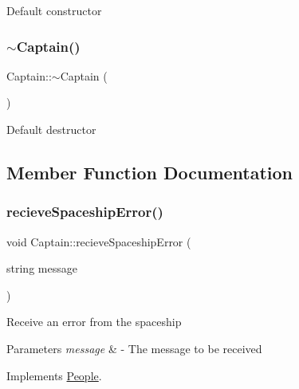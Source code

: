 Default constructor \mbox{\label{classCaptain_a6b8671d624f45a11b7fd33f5ff9a6930}} 
\subsubsection{\texorpdfstring{$\sim$\+Captain()}{~Captain()}}
{\footnotesize\ttfamily Captain\+::$\sim$\+Captain (\begin{DoxyParamCaption}{ }\end{DoxyParamCaption})\hspace{0.3cm}{\ttfamily [inline]}}

Default destructor 

\subsection{Member Function Documentation}
\mbox{\label{classCaptain_a39ebd40ec094b410f295188bb6262009}} 
\subsubsection{\texorpdfstring{recieve\+Spaceship\+Error()}{recieveSpaceshipError()}}
{\footnotesize\ttfamily void Captain\+::recieve\+Spaceship\+Error (\begin{DoxyParamCaption}\item[{string}]{message }\end{DoxyParamCaption})\hspace{0.3cm}{\ttfamily [virtual]}}

Receive an error from the spaceship 
\begin{DoxyParams}{Parameters}
{\em message} & -\/ The message to be received \\
\hline
\end{DoxyParams}


Implements \hyperlink{classPeople_a0685df78be631783138865e03cc7c85d}{People}.

\mbox{\label{classCaptain_a88abc1940bcdef8a655efc20ebd68d50}} 
